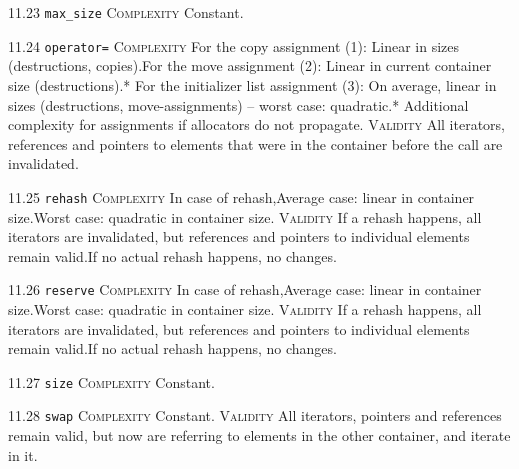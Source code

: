 \noindent\textcolor{cgreen}{11.23 \texttt{max\_size}} \textsc{Complexity} Constant. \vspace{0.5em}

\noindent\textcolor{corange}{11.24 \texttt{operator=}} \textsc{Complexity} For the copy assignment (1): Linear in sizes (destructions, copies).For the move assignment (2): Linear in current container size (destructions).* For the initializer list assignment (3): On average, linear in sizes (destructions, move-assignments) -- worst case: quadratic.* Additional complexity for assignments if allocators do not propagate. \textsc{Validity} All iterators, references and pointers to elements that were in the container before the call are invalidated.\vspace{0.5em}

\noindent\textcolor{corange}{11.25 \texttt{rehash}} \textsc{Complexity} In case of rehash,Average case: linear in container size.Worst case: quadratic in container size. \textsc{Validity} If a rehash happens, all iterators are invalidated, but references and pointers to individual elements remain valid.If no actual rehash happens, no changes.\vspace{0.5em}

\noindent\textcolor{corange}{11.26 \texttt{reserve}} \textsc{Complexity} In case of rehash,Average case: linear in container size.Worst case: quadratic in container size. \textsc{Validity} If a rehash happens, all iterators are invalidated, but references and pointers to individual elements remain valid.If no actual rehash happens, no changes.\vspace{0.5em}

\noindent\textcolor{cgreen}{11.27 \texttt{size}} \textsc{Complexity} Constant. \vspace{0.5em}

\noindent\textcolor{cgreen}{11.28 \texttt{swap}} \textsc{Complexity} Constant. \textsc{Validity} All iterators, pointers and references remain valid, but now are referring to elements in the other container, and iterate in it.\vspace{0.5em}


